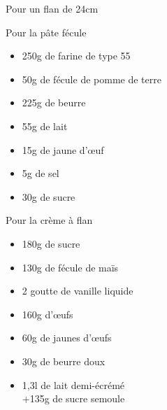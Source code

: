 \medskip
{}
{Pour un flan de 24cm}{Pour la pâte fécule \begin{itemize}
\item 250g de farine de type 55
\item 50g de fécule de pomme de terre
\item 225g de beurre
\item 55g de lait
\item 15g de jaune d'\oe uf
\item 5g de sel
\item 30g de sucre
\end{itemize}
Pour la crème à flan
\begin{itemize}
\item 180g de sucre
\item 130g de fécule de maïs
\item 2 goutte de vanille liquide
\item 160g d'\oe ufs
\item 60g de jaunes d'\oe ufs
\item 30g de beurre doux
\item 1,3l de lait demi-écrémé\\+135g de sucre semoule
\end{itemize}}
